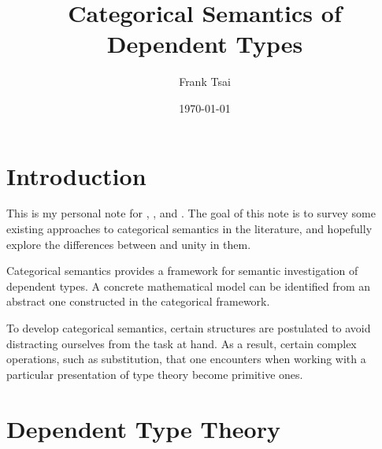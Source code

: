 \documentclass{amsart}
\title{Categorical Semantics of Dependent Types}
\author{Frank Tsai}
\date{\today}
\begin{document}
\maketitle
\tableofcontents

\newcommand{\Ty}{\ensuremath{\mathcal{U}}}
\newcommand{\Tm}{\ensuremath{\widetilde{\mathcal{U}}}}
\newcommand{\El}{\ensuremath{\mathrm{El}}}
\newcommand{\app}{\ensuremath{\mathrm{App}}}
\newcommand{\Block}[1]{\paragraph{\fbox{\textbf{#1}}}}
\newcommand{\ctxt}{\ensuremath{~\mathsf{ctxt}}}
\newcommand{\type}{\ensuremath{~\mathsf{type}}}
\newcommand{\todo}{{\color{red}{TODO}}}

\newcommand{\Fam}{\ensuremath{\mathsf{Fam}}}
\newcommand{\Cop}{\ensuremath{\mathsf{op}}}

\section{Introduction}
\label{sec:introduction}
This is my personal note for \cite{hofmann:ssdts}, \cite{awodey:natmodels}, and \cite{coraglia:context-judgment-deduction}.
The goal of this note is to survey some existing approaches to categorical semantics in the literature, and hopefully explore the differences between and unity in them.

Categorical semantics provides a framework for semantic investigation of dependent types.
A concrete mathematical model can be identified from an abstract one constructed in the categorical framework.

To develop categorical semantics, certain structures are postulated to avoid distracting ourselves from the task at hand.
As a result, certain complex operations, such as substitution, that one encounters when working with a particular presentation of type theory become primitive ones.

\section{Dependent Type Theory}
\label{sec:dependent-type-theory}
\end{document}
